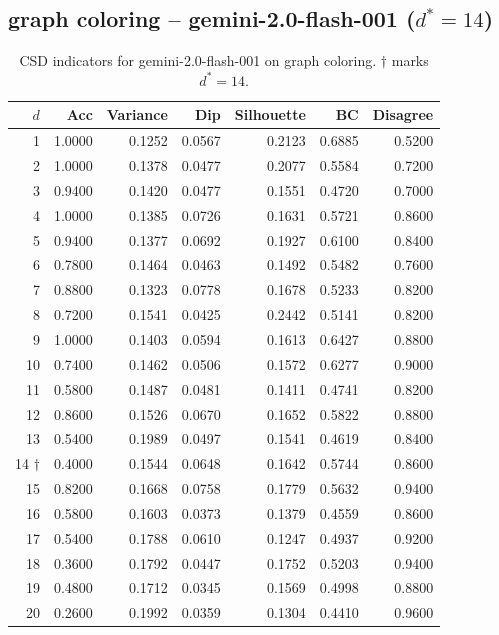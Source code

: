 \documentclass[11pt]{article}
\begin{document}
\subsection{graph coloring -- gemini-2.0-flash-001 ($d^*=14$)}

\begin{table}[h]\centering\small
\begin{tabular}{r|r|r|r|r|r|r}
\toprule
$d$ & Acc & Variance & Dip & Silhouette & BC & Disagree \\
\midrule
1 & 1.0000 & 0.1252 & 0.0567 & 0.2123 & 0.6885 & 0.5200 \\
2 & 1.0000 & 0.1378 & 0.0477 & 0.2077 & 0.5584 & 0.7200 \\
3 & 0.9400 & 0.1420 & 0.0477 & 0.1551 & 0.4720 & 0.7000 \\
4 & 1.0000 & 0.1385 & 0.0726 & 0.1631 & 0.5721 & 0.8600 \\
5 & 0.9400 & 0.1377 & 0.0692 & 0.1927 & 0.6100 & 0.8400 \\
6 & 0.7800 & 0.1464 & 0.0463 & 0.1492 & 0.5482 & 0.7600 \\
7 & 0.8800 & 0.1323 & 0.0778 & 0.1678 & 0.5233 & 0.8200 \\
8 & 0.7200 & 0.1541 & 0.0425 & 0.2442 & 0.5141 & 0.8200 \\
9 & 1.0000 & 0.1403 & 0.0594 & 0.1613 & 0.6427 & 0.8800 \\
10 & 0.7400 & 0.1462 & 0.0506 & 0.1572 & 0.6277 & 0.9000 \\
11 & 0.5800 & 0.1487 & 0.0481 & 0.1411 & 0.4741 & 0.8200 \\
12 & 0.8600 & 0.1526 & 0.0670 & 0.1652 & 0.5822 & 0.8800 \\
13 & 0.5400 & 0.1989 & 0.0497 & 0.1541 & 0.4619 & 0.8400 \\
14 $\dagger$ & 0.4000 & 0.1544 & 0.0648 & 0.1642 & 0.5744 & 0.8600 \\
15 & 0.8200 & 0.1668 & 0.0758 & 0.1779 & 0.5632 & 0.9400 \\
16 & 0.5800 & 0.1603 & 0.0373 & 0.1379 & 0.4559 & 0.8600 \\
17 & 0.5400 & 0.1788 & 0.0610 & 0.1247 & 0.4937 & 0.9200 \\
18 & 0.3600 & 0.1792 & 0.0447 & 0.1752 & 0.5203 & 0.9400 \\
19 & 0.4800 & 0.1712 & 0.0345 & 0.1569 & 0.4998 & 0.8800 \\
20 & 0.2600 & 0.1992 & 0.0359 & 0.1304 & 0.4410 & 0.9600 \\
\bottomrule
\end{tabular}
\caption{CSD indicators for gemini-2.0-flash-001 on graph coloring. $\dagger$ marks $d^*=14$.}
\end{table}
\end{document}
